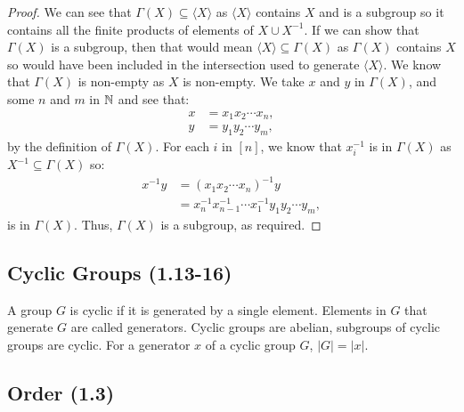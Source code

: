 \begin{proof}
    We can see that $\Gamma(X) \subseteq \langle X \rangle$ as $\langle X \rangle$
    contains $X$ and is a subgroup so it contains all the finite products
    of elements of $X \cup X^{-1}$.
    If we can show that $\Gamma(X)$ is a subgroup, then that would mean
    $\langle X \rangle \subseteq \Gamma(X)$ as $\Gamma(X)$ contains $X$
    so would have been included in the intersection used to generate 
    $\langle X \rangle$. We know that $\Gamma(X)$ is non-empty as $X$ is
    non-empty. We take $x$ and $y$ in $\Gamma(X)$, and some $n$ and $m$ in $\mathbb{N}$
    and see that: \begin{align*}
        x &= x_1 x_2 \cdots x_n, \\
        y &= y_1 y_2 \cdots y_m, 
    \end{align*} by the definition of $\Gamma(X)$. For each $i$ in $[n]$, 
    we know that $x_i^{-1}$ is in $\Gamma(X)$ as 
    $X^{-1} \subseteq \Gamma(X)$ so: \begin{align*}
        x^{-1}y &= (x_1 x_2 \cdots x_n)^{-1}y \\
        &= x_n^{-1}x_{n - 1}^{-1} \cdots x_1^{-1} y_1 y_2 \cdots y_m,
    \end{align*} is in $\Gamma(X)$. Thus, $\Gamma(X)$
    is a subgroup, as required.
\end{proof}

\subsection{Cyclic Groups (1.13-16)} \label{1.13} \label{1.14} \label{1.16}

A group $G$ is cyclic if it is generated by a single element. Elements in
$G$ that generate $G$ are called generators. Cyclic groups are
abelian, subgroups of cyclic groups are cyclic. For a generator $x$
of a cyclic group $G$, $|G| = |x|$. 

\newpage

\subsection{Order (1.3)} \label{1.3}

